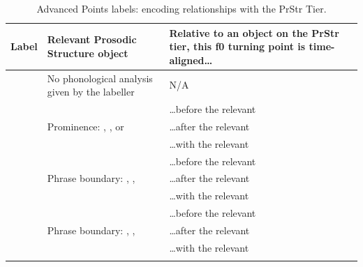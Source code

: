 \documentclass[11pt, twoside]{memoir}
\def\textlabel#1{{\relsize{-.5}\fontspec[Mapping=tex-text]{Roboto Mono}{#1}}}
\begin{document}
\begin{longtable}{c>{\centering}p{.33\linewidth}>{\centering\arraybackslash}p{.45\linewidth}} \toprule \textbf{Label} & \textbf{Relevant Prosodic Structure object} & \textbf{Relative to an object on the PrStr tier, this f0 turning point is time-aligned…}\tabularnewline
\midrule \endhead
\rowcolor{green}\textlabel{0} & No phonological analysis given by the labeller & N/A\tabularnewline
\midrule
\textlabel{*>} & & …before the relevant \textlabel{*}\tabularnewline
\textlabel{*<} & Prominence: \textlabel{*}, \textlabel{?*}, or \textlabel{**} & …after the relevant \textlabel{*}\tabularnewline
\textlabel{*@} & & …with the relevant \textlabel{*}\tabularnewline
\midrule
\textlabel{]>} & & …before the relevant \textlabel{]}\tabularnewline
\textlabel{]<} & Phrase boundary: \textlabel{]}, \textlabel{?]}, \textlabel{]]} & …after the relevant \textlabel{]}\tabularnewline
\textlabel{]@} & & …with the relevant \textlabel{]}\tabularnewline
\midrule
\textlabel{[>} & & …before the relevant \textlabel{[}\tabularnewline
\textlabel{[<} & Phrase boundary: \textlabel{[}, \textlabel{?[}, \textlabel{[[} & …after the relevant \textlabel{[}\tabularnewline
\textlabel{[@} & & …with the relevant \textlabel{[}\tabularnewline
\bottomrule
\caption{Advanced Points labels: encoding relationships with the PrStr Tier.}
\end{longtable}
\end{document}
